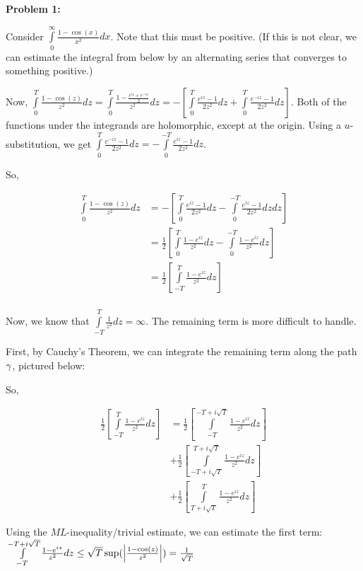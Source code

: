 \documentclass[a4paper,12pt]{article}
\begin{document}
{\bf Problem 1:}

Consider $\int\limits_0^\infty \frac{1-\cos(x)}{x^2} dx$. Note that this must be positive. (If this is not clear, we can estimate the integral from below by an alternating series that converges to something positive.)

Now, $\int\limits_0^T\frac{1-\cos(z)}{z^2} dz = \int\limits_0^T\frac{1-\frac{e^{iz}+e^{-iz}}{2}}{z^2} dz = -\left[\int\limits_0^T \frac{e^{iz}-1}{2z^2} dz+ \int\limits_0^T \frac{e^{-iz}-1}{2z^2} dz\right]$. Both of the functions under the integrands are holomorphic, except at the origin. Using a $u$-substitution, we get $\int\limits_0^T \frac{e^{-iz}-1}{2z^2} dz = -\int\limits_0^{-T} \frac{e^{iz}-1}{2z^2} dz$.

So, 

\begin{align*}
\int\limits_0^T\frac{1-\cos(z)}{z^2} dz &= -\left[\int\limits_0^T \frac{e^{iz}-1}{2z^2} dz- \int\limits_0^{-T} \frac{e^{iz}-1}{2z^2} dz dz\right]\\
&= \frac{1}{2}\left[\int\limits_0^T \frac{1-e^{iz}}{z^2} dz-\int\limits_0^{-T} \frac{1-e^{iz}}{z^2} dz \right]\\
&= \frac{1}{2}\left[\int\limits_{-T}^T \frac{1-e^{iz}}{z^2} dz \right]\\
\end{align*} %

Now, we know that $\int\limits_{-T}^T \frac{1}{z^2} dz = \infty$. The remaining term is more difficult to handle.

First, by Cauchy's Theorem, we can integrate the remaining term along the path $\gamma$, pictured below:

\shunt %

So, 

\begin{align*}
\frac{1}{2}\left[\int\limits_{-T}^T \frac{1-e^{iz}}{z^2} dz \right] &= \frac{1}{2}\left[\int\limits_{-T}^{-T+i\sqrt{T}} \frac{1-e^{iz}}{z^2} dz \right]\\
&+ \frac{1}{2}\left[\int\limits_{-T+i\sqrt{T}}^{T+i\sqrt{T}} \frac{1-e^{iz}}{z^2} dz \right]\\
&+ \frac{1}{2}\left[\int\limits_{T+i\sqrt{T}}^T \frac{1-e^{iz}}{z^2} dz \right]
\end{align*} %

Using the $ML$-inequality/trivial estimate, we can estimate the first term: $\int\limits_{-T}^{-T+i\sqrt{T}} \frac{1-e^{iz}}{z^2} dz \leq \sqrt{T} \sup(\left\lvert \frac{1-\cos(z)}{z^2} \right\rvert) = \frac{1}{\sqrt{T}}$
\end{document}
